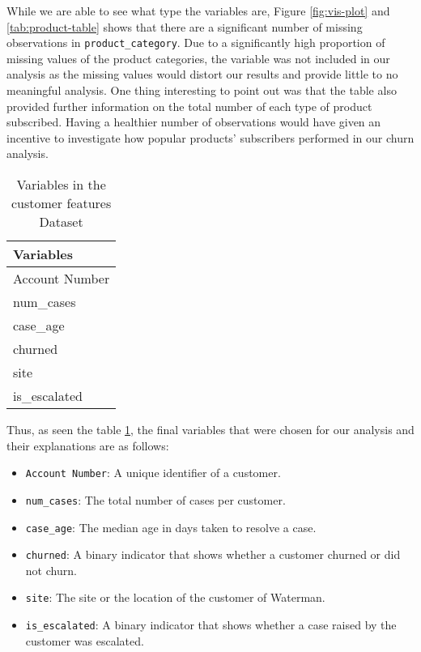 \documentclass[
]{article}
\begin{document}
While we are able to see what type the variables are, Figure \ref{fig:vis-plot} and \ref{tab:product-table} shows that there are a significant number of missing observations in \texttt{product\_category}. Due to a significantly high proportion of missing values of the product categories, the variable was not included in our analysis as the missing values would distort our results and provide little to no meaningful analysis. One thing interesting to point out was that the table also provided further information on the total number of each type of product subscribed. Having a healthier number of observations would have given an incentive to investigate how popular products' subscribers performed in our churn analysis.

\begin{table}

\caption{\label{tab:noprod-table}Variables in the customer features Dataset}
\centering
\begin{tabular}[t]{l}
\hline
Variables\\
\hline
Account Number\\
\hline
num\_cases\\
\hline
case\_age\\
\hline
churned\\
\hline
site\\
\hline
is\_escalated\\
\hline
\end{tabular}
\end{table}

Thus, as seen the table \ref{tab:noprod-table}, the final variables that were chosen for our analysis and their explanations are as follows:

\begin{itemize}
\item
  \texttt{Account\ Number}: A unique identifier of a customer.
\item
  \texttt{num\_cases}: The total number of cases per customer.
\item
  \texttt{case\_age}: The median age in days taken to resolve a case.
\item
  \texttt{churned}: A binary indicator that shows whether a customer churned or did not churn.
\item
  \texttt{site}: The site or the location of the customer of Waterman.
\item
  \texttt{is\_escalated}: A binary indicator that shows whether a case raised by the customer was escalated.
\end{itemize}
\end{document}
